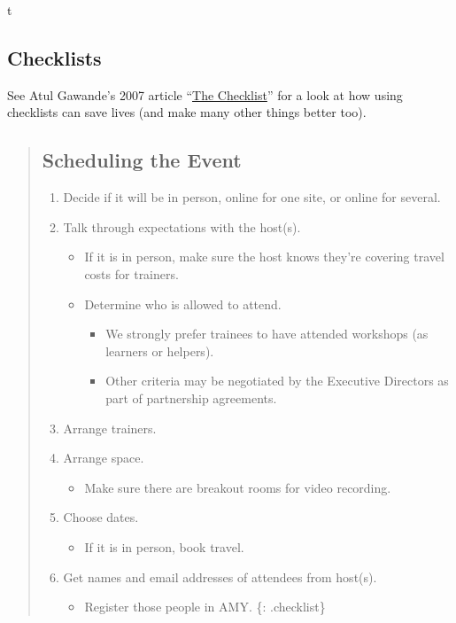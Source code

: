 t

\subsection{Checklists}\label{checklists}

See Atul Gawande's 2007 article
``\href{http://www.newyorker.com/magazine/2007/12/10/the-checklist}{The
Checklist}'' for a look at how using checklists can save lives (and make
many other things better too).

\begin{quote}
\subsection{Scheduling the Event}\label{scheduling-the-event}

\begin{enumerate}
\item
  Decide if it will be in person, online for one site, or online for
  several.
\item
  Talk through expectations with the host(s).

  \begin{itemize}
    \item
    If it is in person, make sure the host knows they're covering travel
    costs for trainers.
  \item
    Determine who is allowed to attend.

    \begin{itemize}
        \item
      We strongly prefer trainees to have attended workshops (as
      learners or helpers).
    \item
      Other criteria may be negotiated by the Executive Directors as
      part of partnership agreements.
    \end{itemize}
  \end{itemize}
\item
  Arrange trainers.
\item
  Arrange space.

  \begin{itemize}
    \item
    Make sure there are breakout rooms for video recording.
  \end{itemize}
\item
  Choose dates.

  \begin{itemize}
    \item
    If it is in person, book travel.
  \end{itemize}
\item
  Get names and email addresses of attendees from host(s).

  \begin{itemize}
    \item
    Register those people in AMY. \{: .checklist\}
  \end{itemize}
\end{enumerate}
\end{quote}

